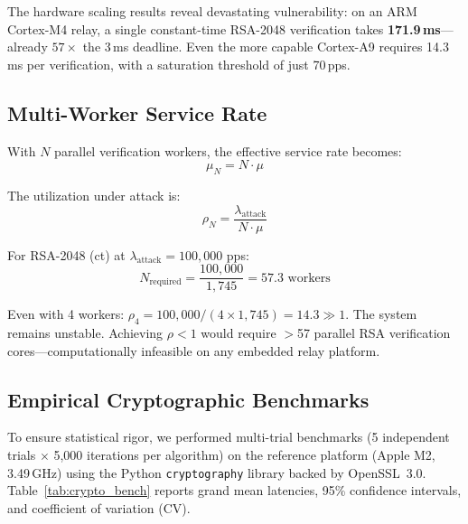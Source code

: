 \documentclass{ieeeaccess}
\begin{document}
The hardware scaling results reveal devastating vulnerability: on an ARM Cortex-M4 relay, a single constant-time RSA-2048 verification takes \textbf{171.9\,ms}---already $57\times$ the 3\,ms deadline. Even the more capable Cortex-A9 requires 14.3\,ms per verification, with a saturation threshold of just 70\,pps.

\subsection{Multi-Worker Service Rate}
With $N$ parallel verification workers, the effective service rate becomes:
\begin{equation}
\mu_N = N \cdot \mu
\end{equation}

The utilization under attack is:
\begin{equation}
\rho_N = \frac{\lambda_{\text{attack}}}{N \cdot \mu}
\end{equation}

For RSA-2048 (ct) at $\lambda_{\text{attack}} = 100{,}000$ pps:
\begin{equation}
N_{\text{required}} = \frac{100{,}000}{1{,}745} = 57.3 \text{ workers}
\end{equation}

Even with 4 workers: $\rho_4 = 100{,}000/(4 \times 1{,}745) = 14.3 \gg 1$. The system remains unstable. Achieving $\rho < 1$ would require $>$57 parallel RSA verification cores---computationally infeasible on any embedded relay platform.

\subsection{Empirical Cryptographic Benchmarks}
To ensure statistical rigor, we performed multi-trial benchmarks (5 independent trials $\times$ 5,000 iterations per algorithm) on the reference platform (Apple M2, 3.49\,GHz) using the Python \texttt{cryptography} library backed by OpenSSL~3.0. Table~\ref{tab:crypto_bench} reports grand mean latencies, 95\% confidence intervals, and coefficient of variation (CV).
\end{document}
